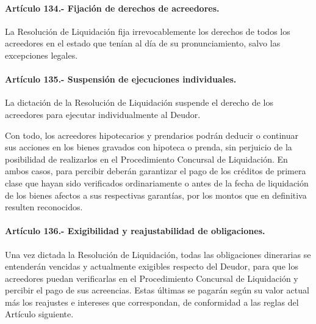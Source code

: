 \documentclass[
]{book}
\begin{document}
\hypertarget{artuxedculo-134.--fijaciuxf3n-de-derechos-de-acreedores.}{%
\paragraph*{Artículo 134.- Fijación de derechos de acreedores.}\label{artuxedculo-134.--fijaciuxf3n-de-derechos-de-acreedores.}}

La Resolución de Liquidación fija irrevocablemente los derechos de todos los acreedores en el estado que tenían al día de su pronunciamiento, salvo las excepciones legales.

\hypertarget{artuxedculo-135.--suspensiuxf3n-de-ejecuciones-individuales.}{%
\paragraph*{Artículo 135.- Suspensión de ejecuciones individuales.}\label{artuxedculo-135.--suspensiuxf3n-de-ejecuciones-individuales.}}

La dictación de la Resolución de Liquidación suspende el derecho de los acreedores para ejecutar individualmente al Deudor.

Con todo, los acreedores hipotecarios y prendarios podrán deducir o continuar sus acciones en los bienes gravados con hipoteca o prenda, sin perjuicio de la posibilidad de realizarlos en el Procedimiento Concursal de Liquidación. En ambos casos, para percibir deberán garantizar el pago de los créditos de primera clase que hayan sido verificados ordinariamente o antes de la fecha de liquidación de los bienes afectos a sus respectivas garantías, por los montos que en definitiva resulten reconocidos.

\hypertarget{artuxedculo-136.--exigibilidad-y-reajustabilidad-de-obligaciones.}{%
\paragraph*{Artículo 136.- Exigibilidad y reajustabilidad de obligaciones.}\label{artuxedculo-136.--exigibilidad-y-reajustabilidad-de-obligaciones.}}

Una vez dictada la Resolución de Liquidación, todas las obligaciones dinerarias se entenderán vencidas y actualmente exigibles respecto del Deudor, para que los acreedores puedan verificarlas en el Procedimiento Concursal de Liquidación y percibir el pago de sus acreencias. Estas últimas se pagarán según su valor actual más los reajustes e intereses que correspondan, de conformidad a las reglas del Artículo siguiente.
\end{document}
